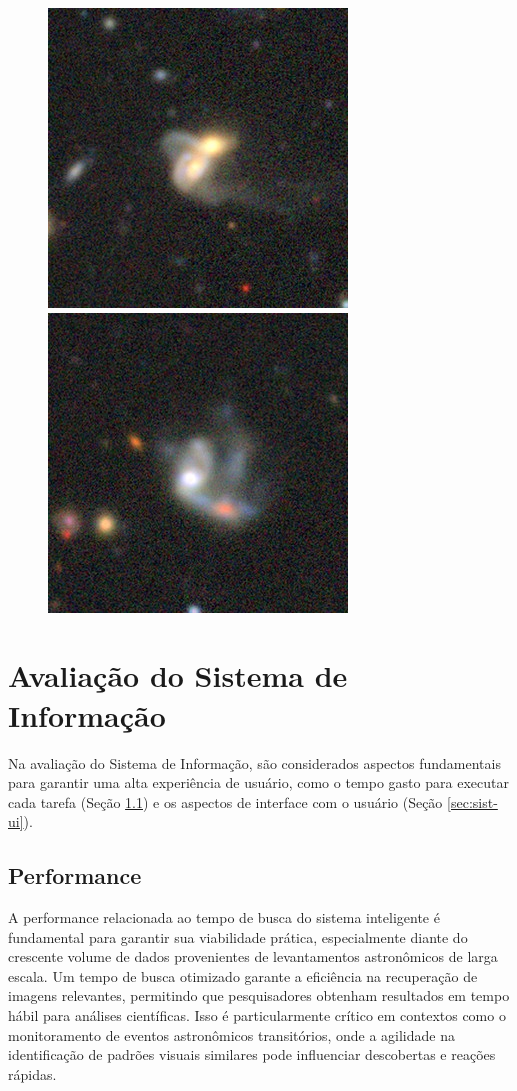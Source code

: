 \begin{figure}[!ht]
  \includegraphics[width=0.195\linewidth]{figures/stamps/q7_28}
  \includegraphics[width=0.195\linewidth]{figures/stamps/q7_29}
\end{figure}



\section{Avaliação do Sistema de Informação}
\label{sec:res-sist}

Na avaliação do Sistema de Informação, são considerados aspectos fundamentais para garantir uma alta experiência de usuário, como o tempo gasto para executar cada tarefa (Seção \ref{sec:sist-performance}) e os aspectos de interface com o usuário (Seção \ref{sec:sist-ui}).


\subsection{Performance}
\label{sec:sist-performance}

A performance relacionada ao tempo de busca do sistema inteligente é fundamental para garantir sua viabilidade prática, especialmente diante do crescente volume de dados provenientes de levantamentos astronômicos de larga escala. Um tempo de busca otimizado garante a eficiência na recuperação de imagens relevantes, permitindo que pesquisadores obtenham resultados em tempo hábil para análises científicas. Isso é particularmente crítico em contextos como o monitoramento de eventos astronômicos transitórios, onde a agilidade na identificação de padrões visuais similares pode influenciar descobertas e reações rápidas.

